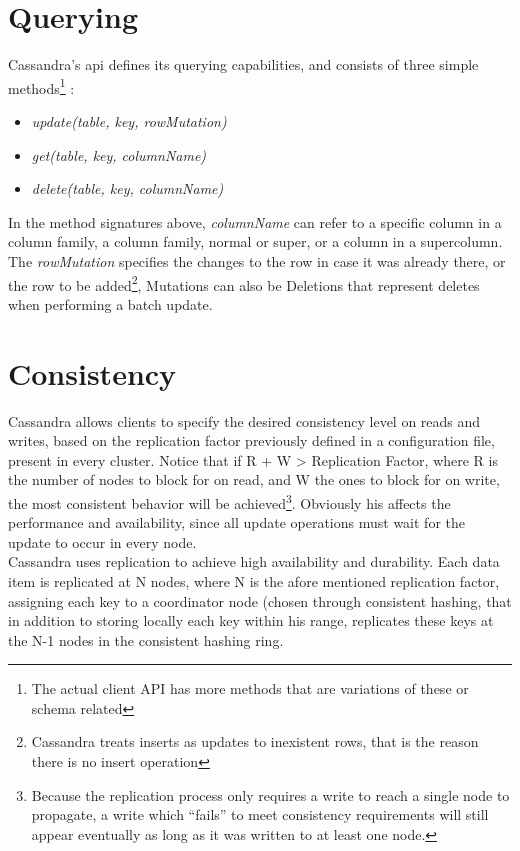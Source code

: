 \section{Querying}
Cassandra's \ac{api} defines its querying capabilities, and consists of three simple methods\footnote{The actual client API has more methods that are variations of these or schema related} \cite{lakshmanMalik}:

\begin{itemize}
	\item \emph{update(table, key, rowMutation)}
	\item \emph{get(table, key, columnName)}
	\item \emph{delete(table, key, columnName)}
\end{itemize}	

In the method signatures above, \emph{columnName} can refer to a specific column in a column family, a column family, normal or super, or a column in a supercolumn. The \emph{rowMutation} specifies the changes to the row in case it was already there, or the row to be added\footnote{Cassandra treats inserts as updates to inexistent rows, that is the reason there is no insert operation}, Mutations can also be Deletions that represent deletes when performing a batch update.

\section{Consistency}
\label{sec:consistency}
Cassandra allows clients to specify the desired consistency level on reads and writes, based on the replication factor previously defined in a configuration file, present in every cluster. Notice that if R + W > Replication Factor, where R is the number of nodes to block for on read, and W the ones to block for on write, the most consistent behavior will be achieved\footnote{Because the replication process only requires a write to reach a single node to propagate, a write which ``fails'' to meet consistency requirements will still appear eventually as long as it was written to at least one node.}. Obviously his affects the performance and availability, since all update operations must wait for the update to occur in every node.\\

Cassandra uses replication to achieve high availability and durability. Each data item is replicated at N nodes, where N is the afore mentioned replication factor, assigning each key to a coordinator node (chosen through consistent hashing, that in addition to storing locally each key within his range, replicates these keys at the N-1 nodes in the consistent hashing ring. 

